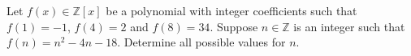 Let $f(x) \in \mathbb{Z}[x]$ be a polynomial with integer coefficients such
that $f(1) = -1$, $f(4) = 2$ and $f(8) = 34$. Suppose $n \in \mathbb{Z}$ is an
integer such that $f(n) = n^2 - 4n - 18$. Determine all possible values for
$n$.
